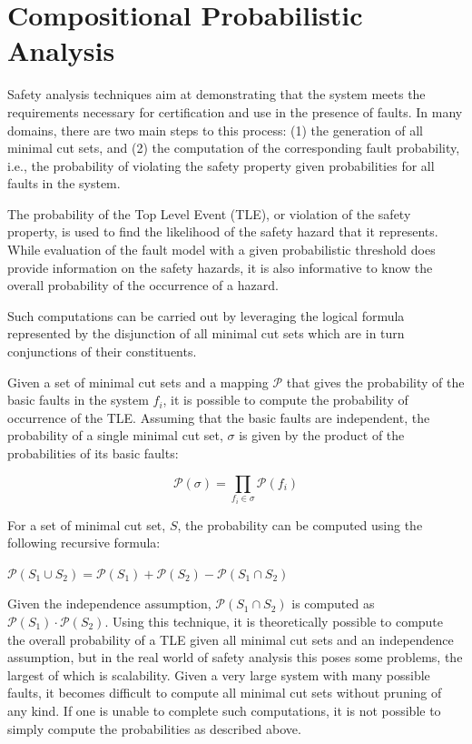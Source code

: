 


\section{Compositional Probabilistic Analysis}
Safety analysis techniques aim at demonstrating that the system meets the requirements necessary for certification and use in the presence of faults. In many domains, there are two main steps to this process: (1) the generation of all minimal cut sets, and (2) the computation of the corresponding fault probability, i.e., the probability of violating the safety property given probabilities for all faults in the system. 

The probability of the Top Level Event (TLE), or violation of the safety property, is used to find the likelihood of the safety hazard that it represents. While evaluation of the fault model with a given probabilistic threshold does provide information on the safety hazards, it is also informative to know the overall probability of the occurrence of a hazard. 

Such computations can be carried out by leveraging the logical formula represented by the disjunction of all minimal cut sets which are in turn conjunctions of their constituents. 

Given a set of minimal cut sets and a mapping $\mathcal{P}$ that gives the probability of the basic faults in the system $f_i$, it is possible to compute the probability of occurrence of the TLE. Assuming that the basic faults are independent, the probability of a single minimal cut set, $\sigma$ is given by the product of the probabilities of its basic faults:
\begin{center}
    \begin{equation*}\mathcal{P}(\sigma) = \prod_{f_i \in \sigma} \mathcal{P}(f_i) 
    \end{equation*}    
\end{center}

For a set of minimal cut set, $S$, the probability can be computed using the following recursive formula:

\begin{center}
    $\mathcal{P}(S_1 \cup S_2) = \mathcal{P}(S_1) + \mathcal{P}(S_2) - \mathcal{P}(S_1 \cap S_2)$
\end{center}

Given the independence assumption, $\mathcal{P}(S_1 \cap S_2)$ is computed as $\mathcal{P}(S_1) \cdot   \mathcal{P}(S_2)$. Using this technique, it is theoretically possible to compute the overall probability of a TLE given all minimal cut sets and an independence assumption, but in the real world of safety analysis this poses some problems, the largest of which is scalability. Given a very large system with many possible faults, it becomes difficult to compute all minimal cut sets without pruning of any kind. If one is unable to complete such computations, it is not possible to simply compute the probabilities as described above. 

